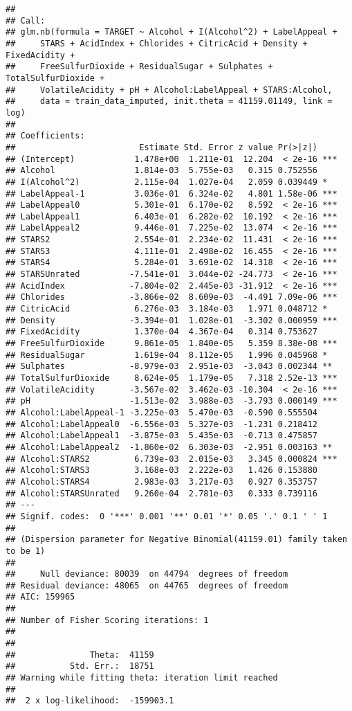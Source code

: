 \documentclass[
]{article}
\begin{document}
\begin{verbatim}
## 
## Call:
## glm.nb(formula = TARGET ~ Alcohol + I(Alcohol^2) + LabelAppeal + 
##     STARS + AcidIndex + Chlorides + CitricAcid + Density + FixedAcidity + 
##     FreeSulfurDioxide + ResidualSugar + Sulphates + TotalSulfurDioxide + 
##     VolatileAcidity + pH + Alcohol:LabelAppeal + STARS:Alcohol, 
##     data = train_data_imputed, init.theta = 41159.01149, link = log)
## 
## Coefficients:
##                         Estimate Std. Error z value Pr(>|z|)    
## (Intercept)            1.478e+00  1.211e-01  12.204  < 2e-16 ***
## Alcohol                1.814e-03  5.755e-03   0.315 0.752556    
## I(Alcohol^2)           2.115e-04  1.027e-04   2.059 0.039449 *  
## LabelAppeal-1          3.036e-01  6.324e-02   4.801 1.58e-06 ***
## LabelAppeal0           5.301e-01  6.170e-02   8.592  < 2e-16 ***
## LabelAppeal1           6.403e-01  6.282e-02  10.192  < 2e-16 ***
## LabelAppeal2           9.446e-01  7.225e-02  13.074  < 2e-16 ***
## STARS2                 2.554e-01  2.234e-02  11.431  < 2e-16 ***
## STARS3                 4.111e-01  2.498e-02  16.455  < 2e-16 ***
## STARS4                 5.284e-01  3.691e-02  14.318  < 2e-16 ***
## STARSUnrated          -7.541e-01  3.044e-02 -24.773  < 2e-16 ***
## AcidIndex             -7.804e-02  2.445e-03 -31.912  < 2e-16 ***
## Chlorides             -3.866e-02  8.609e-03  -4.491 7.09e-06 ***
## CitricAcid             6.276e-03  3.184e-03   1.971 0.048712 *  
## Density               -3.394e-01  1.028e-01  -3.302 0.000959 ***
## FixedAcidity           1.370e-04  4.367e-04   0.314 0.753627    
## FreeSulfurDioxide      9.861e-05  1.840e-05   5.359 8.38e-08 ***
## ResidualSugar          1.619e-04  8.112e-05   1.996 0.045968 *  
## Sulphates             -8.979e-03  2.951e-03  -3.043 0.002344 ** 
## TotalSulfurDioxide     8.624e-05  1.179e-05   7.318 2.52e-13 ***
## VolatileAcidity       -3.567e-02  3.462e-03 -10.304  < 2e-16 ***
## pH                    -1.513e-02  3.988e-03  -3.793 0.000149 ***
## Alcohol:LabelAppeal-1 -3.225e-03  5.470e-03  -0.590 0.555504    
## Alcohol:LabelAppeal0  -6.556e-03  5.327e-03  -1.231 0.218412    
## Alcohol:LabelAppeal1  -3.875e-03  5.435e-03  -0.713 0.475857    
## Alcohol:LabelAppeal2  -1.860e-02  6.303e-03  -2.951 0.003163 ** 
## Alcohol:STARS2         6.739e-03  2.015e-03   3.345 0.000824 ***
## Alcohol:STARS3         3.168e-03  2.222e-03   1.426 0.153880    
## Alcohol:STARS4         2.983e-03  3.217e-03   0.927 0.353757    
## Alcohol:STARSUnrated   9.260e-04  2.781e-03   0.333 0.739116    
## ---
## Signif. codes:  0 '***' 0.001 '**' 0.01 '*' 0.05 '.' 0.1 ' ' 1
## 
## (Dispersion parameter for Negative Binomial(41159.01) family taken to be 1)
## 
##     Null deviance: 80039  on 44794  degrees of freedom
## Residual deviance: 48065  on 44765  degrees of freedom
## AIC: 159965
## 
## Number of Fisher Scoring iterations: 1
## 
## 
##               Theta:  41159 
##           Std. Err.:  18751 
## Warning while fitting theta: iteration limit reached 
## 
##  2 x log-likelihood:  -159903.1
\end{verbatim}
\end{document}
